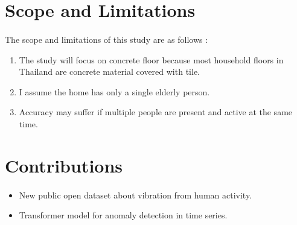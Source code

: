\section{Scope and Limitations}
\paragraph{}
The scope and limitations of this study are as follows :
\begin{enumerate}
\item The study will focus on concrete floor because most household floors in Thailand are concrete material covered with tile.
\item I assume the home has only a single elderly person.
\item Accuracy may suffer if multiple people are present and active at the same time.
\end{enumerate} 

\section{Contributions}
\paragraph{}

\begin{itemize}
    \item New public open dataset about vibration from human activity.
    \item Transformer model for anomaly detection in time series.
\end{itemize}


